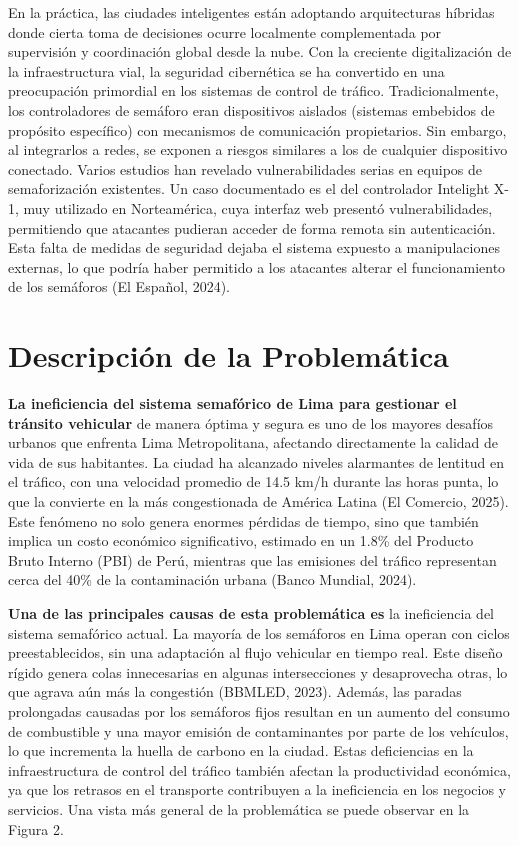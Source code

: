 \documentclass[12pt,a4paper,oneside]{report}
\begin{document}
En la práctica, las ciudades inteligentes están adoptando arquitecturas híbridas donde cierta toma de decisiones ocurre localmente complementada por supervisión y coordinación global desde la nube. Con la creciente digitalización de la infraestructura vial, la seguridad cibernética se ha convertido en una preocupación primordial en los sistemas de control de tráfico. Tradicionalmente, los controladores de semáforo eran dispositivos aislados (sistemas embebidos de propósito específico) con mecanismos de comunicación propietarios. Sin embargo, al integrarlos a redes, se exponen a riesgos similares a los de cualquier dispositivo conectado. Varios estudios han revelado vulnerabilidades serias en equipos de semaforización existentes. Un caso documentado es el del controlador Intelight X-1, muy utilizado en Norteamérica, cuya interfaz web presentó vulnerabilidades, permitiendo que atacantes pudieran acceder de forma remota sin autenticación. Esta falta de medidas de seguridad dejaba el sistema expuesto a manipulaciones externas, lo que podría haber permitido a los atacantes alterar el funcionamiento de los semáforos (El Español, 2024).

\section{Descripción de la Problemática}\label{descripciuxf3n-de-la-problemuxe1tica}

\textbf{La ineficiencia del sistema semafórico de Lima para gestionar el tránsito vehicular} de manera óptima y segura es uno de los mayores desafíos urbanos que enfrenta Lima Metropolitana, afectando directamente la calidad de vida de sus habitantes. La ciudad ha alcanzado niveles alarmantes de lentitud en el tráfico, con una velocidad promedio de 14.5 km/h durante las horas punta, lo que la convierte en la más congestionada de América Latina (El Comercio, 2025). Este fenómeno no solo genera enormes pérdidas de tiempo, sino que también implica un costo económico significativo, estimado en un 1.8\% del Producto Bruto Interno (PBI) de Perú, mientras que las emisiones del tráfico representan cerca del 40\% de la contaminación urbana (Banco Mundial, 2024).

\textbf{Una de las principales causas de esta problemática es} la ineficiencia del sistema semafórico actual. La mayoría de los semáforos en Lima operan con ciclos preestablecidos, sin una adaptación al flujo vehicular en tiempo real. Este diseño rígido genera colas innecesarias en algunas intersecciones y desaprovecha otras, lo que agrava aún más la congestión (BBMLED, 2023). Además, las paradas prolongadas causadas por los semáforos fijos resultan en un aumento del consumo de combustible y una mayor emisión de contaminantes por parte de los vehículos, lo que incrementa la huella de carbono en la ciudad. Estas deficiencias en la infraestructura de control del tráfico también afectan la productividad económica, ya que los retrasos en el transporte contribuyen a la ineficiencia en los negocios y servicios. Una vista más general de la problemática se puede observar en la Figura 2.
\end{document}
